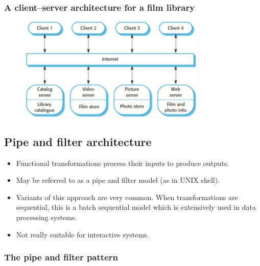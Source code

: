 \subsubsection{A client–server architecture for a film library}
\begin{figure}[h!]
    \centering
    \includegraphics[width = 0.8\textwidth]{./figures/L3_7.png}
    \caption{}
    \label{fig:L3_7}
\end{figure}

\subsection{Pipe and filter architecture}
\begin{itemize}
\item Functional transformations process their inputs to produce outputs.

\item May be referred to as a pipe and filter model (as in UNIX shell).

\item Variants of this approach are very common. When transformations are sequential, this is a batch sequential model which is extensively used in data processing systems.

\item Not really suitable for interactive systems.
\end{itemize}

\newpage
\subsubsection{The pipe and filter pattern}

